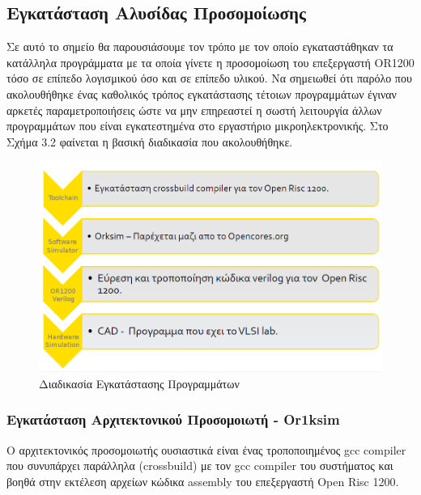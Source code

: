 \documentclass[a4paper,10pt]{article}
\numberwithin{figure}{section}
\numberwithin{table}{section}
\begin{document}
\newpage


\subsection{Εγκατάσταση Αλυσίδας Προσομοίωσης}
Σε αυτό το σημείο θα παρουσιάσουμε τον τρόπο με τον οποίο εγκαταστάθηκαν τα κατάλληλα προγράμματα με τα οποία γίνετε η προσομοίωση του επεξεργαστή OR1200 τόσο σε επίπεδο λογισμικού όσο και σε επίπεδο υλικού.
\newline
 Να σημειωθεί ότι παρόλο που ακολουθήθηκε ένας καθολικός τρόπος εγκατάστασης τέτοιων προγραμμάτων έγιναν αρκετές παραμετροποιήσεις
ώστε να μην επηρεαστεί η σωστή λειτουργία άλλων προγραμμάτων που είναι εγκατεστημένα στο εργαστήριο μικροηλεκτρονικής. Στο Σχήμα 3.2 φαίνεται η βασική διαδικασία που ακολουθήθηκε.

\vspace{0.7cm}
\begin{figure}[h!]
 \centering
 \includegraphics[bb=0 0 959 590,scale=0.35]{./Images/toolchain.png}
 \caption{Διαδικασία Εγκατάστασης Προγραμμάτων}
\end{figure}
\vspace{0.7cm}
\newpage


\subsubsection{Εγκατάσταση Αρχιτεκτονικού Προσομοιωτή - Or1ksim}

Ο αρχιτεκτονικός προσομοιωτής ουσιαστικά είναι ένας τροποποιημένος gcc compiler που συνυπάρχει παράλληλα (crossbuild) με τον gcc compiler του συστήματος και βοηθά στην εκτέλεση αρχείων κώδικα assembly του επεξεργαστή Open Risc 1200.
\newline
\end{document}
